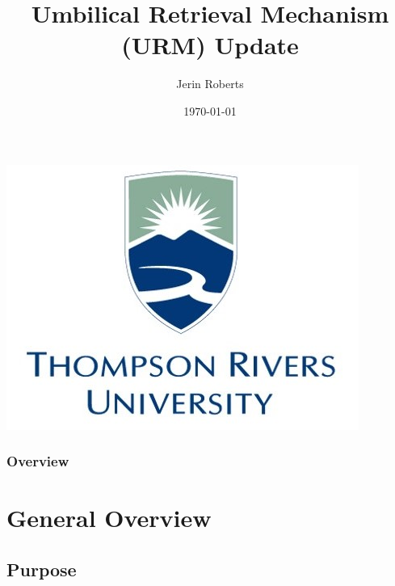 \documentclass{beamer}
\title[URM]{Umbilical Retrieval Mechanism (URM) Update} %
\author{Jerin Roberts} %
\institute[TRU] %
{
 
\textit{robertsj@snolab.ca} \\

}
\date{\today} %
\begin{document}
\begin{frame}
\centering
\includegraphics[width=0.15\linewidth]{tru}
\titlepage %
\end{frame}

\begin{frame}
\frametitle{Overview} %
\tableofcontents %
\end{frame}


\section{General Overview} %

\subsection{Purpose} %
\end{document}
